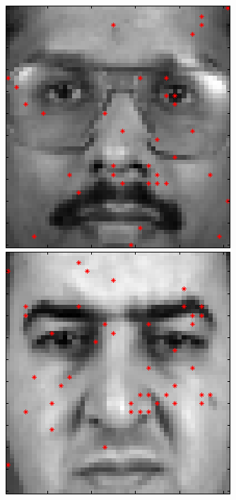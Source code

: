\begin{figure}[ht]
 \includegraphics[width=\textwidth*11/100]{ch5/figures/FeaturesonFace_BGC3.png}
 \includegraphics[width=\textwidth*11/100]{ch5/figures/FeaturesonFace_BGC4.png}

\end{figure}
